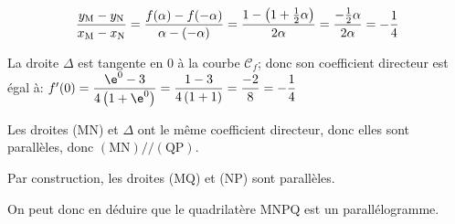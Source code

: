 \begin{enumerate}
\begin{enumerate}
\[\dfrac{y_{\text M} - y_{\text N}}{x_{\text M} - x_{\text N}}
= \dfrac{f(\alpha) - f(-\alpha)}{\alpha-(-\alpha)}
= \dfrac{1-\left (1+\frac{1}{2}\alpha\right )}{2\alpha}
= \dfrac{-\frac{1}{2}\alpha}{2\alpha}
= -\dfrac{1}{4}\]

La droite $\Delta$ est tangente en 0 à la courbe $\mathcal{C}_f$; donc son coefficient directeur est égal à:
$f'(0)=\dfrac{\e^{0}-3}{4\left (1+\e^{0}\right )}
= \dfrac{1-3}{4\left (1+1\right )}
= \dfrac{-2}{8}
= -\dfrac{1}{4}$

Les droites (MN) et $\Delta$ ont le même coefficient directeur, donc elles sont parallèles, donc $(\text{MN}) /\!/ (\text{QP})$.

Par construction, les droites (MQ) et (NP) sont parallèles.

On peut donc en déduire que le quadrilatère MNPQ est un parallélogramme.
	\end{enumerate}
\end{enumerate}
